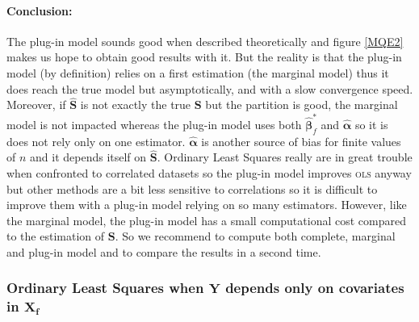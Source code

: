 \documentclass[12pt,a4paper]{report}
\begin{document}
	\paragraph{Conclusion:} The plug-in model sounds good when described theoretically and figure \ref{MQE2} makes us hope to obtain good results with it. But the reality is that the plug-in model (by definition) relies on a first estimation (the marginal model) thus it does reach the true model but asymptotically, and with a slow convergence speed. \\
	Moreover, if $\hat{\boldsymbol{S}}$ is not exactly the true $\boldsymbol{S}$ but the partition is good, the marginal model is not impacted whereas the plug-in model uses both $\hat{\boldsymbol{\beta}}^*_{f}$ and $\hat{\boldsymbol{\alpha}}$ so it is does not rely only on one estimator. $\hat{\boldsymbol{\alpha}}$ is another source of bias for finite values of $n$ and it depends itself on $\hat{\boldsymbol{S}}$. Ordinary Least Squares really are in great trouble when confronted to correlated datasets so the plug-in model improves \textsc{ols} anyway but other methods are a bit less sensitive to correlations so it is difficult to improve them with a plug-in model relying on so many estimators. However, like the marginal model, the plug-in model has a small computational cost compared to the estimation of $\boldsymbol{S}$. So we recommend to compute both complete, marginal and plug-in model and to compare the results in a second time.

 
 
\FloatBarrier

\newpage
	\setcellgapes{1pt}
\subsubsection{Ordinary Least Squares when $\boldsymbol{Y}$ depends only on covariates in $\boldsymbol{X_f}$}
\end{document}

